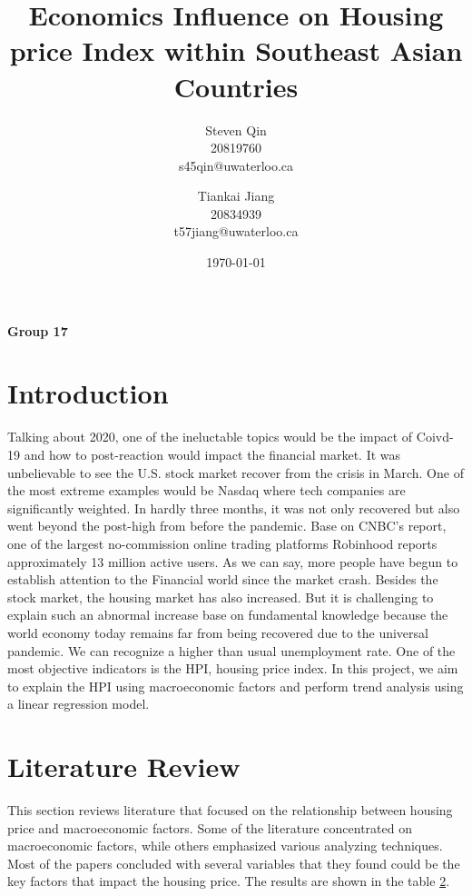 \documentclass[11pt]{article}
\title{Economics Influence on Housing price Index within Southeast Asian Countries}
\author{Steven Qin\\20819760\\s45qin@uwaterloo.ca \and Tiankai Jiang\\20834939\\t57jiang@uwaterloo.ca}
\date{\today}
\begin{document}
\maketitle
\begin{center}
\textbf{Group 17}
\end{center}

\section{Introduction}\label{introduction}
Talking about 2020, one of the ineluctable topics would be the impact of Coivd-19 and how to post-reaction would impact the financial market. It was unbelievable to see the U.S. stock market recover from the crisis in March. One of the most extreme examples would be Nasdaq where tech companies are significantly weighted. In hardly three months, it was not only recovered but also went beyond the post-high from before the pandemic. Base on CNBC's report, one of the largest no-commission online trading platforms Robinhood reports approximately 13 million active users. As we can say, more people have begun to establish attention to the Financial world since the market crash. Besides the stock market, the housing market has also increased. But it is challenging to explain such an abnormal increase base on fundamental knowledge because the world economy today remains far from being recovered due to the universal pandemic. We can recognize a higher than usual unemployment rate. One of the most objective indicators is the HPI, housing price index. In this project, we aim to explain the HPI using macroeconomic factors and perform trend analysis using a linear regression model. 

\section{Literature Review}\label{literature_review}
This section reviews literature that focused on the relationship between housing price and macroeconomic factors. Some of the literature concentrated on macroeconomic factors, while others emphasized various analyzing techniques. Most of the papers concluded with several variables that they found could be the key factors that impact the housing price. The results are shown in the table \ref{literature_review}.
\end{document}

